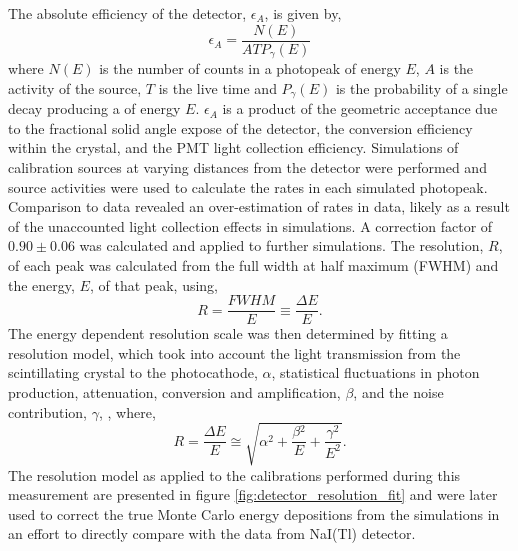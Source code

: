 The absolute efficiency of the detector, $\epsilon_{A}$, is given by,
%
\begin{equation}
    \epsilon_{A} = \frac{N(E)}{ATP_{\gamma}(E)}
    \label{eq:detector_eff}
\end{equation}
%
where $N(E)$ is the number of counts in a photopeak of energy $E$, $A$ is the activity of the source, $T$ is the live time and $P_{\gamma}(E)$ is the probability of a single decay producing a \gray{} of energy $E$. $\epsilon_{A}$ is a product of the geometric acceptance due to the fractional solid angle expose of the detector, the \gray{} conversion efficiency within the crystal, and the PMT light collection efficiency. Simulations of calibration sources at varying distances from the detector were performed and source activities were used to calculate the rates in each simulated photopeak. Comparison to data revealed an over-estimation of rates in data, likely as a result of the unaccounted light collection effects in simulations. A correction factor of $0.90 \pm 0.06$ was calculated and applied to further simulations. The resolution, $R$, of each peak was calculated from the full width at half maximum (FWHM) and the energy, $E$, of that peak, using,
%
\begin{equation}
    R = \frac{FWHM}{E} \equiv \frac{\Delta{}E}{E}.
    \label{eq:detector_eff}
\end{equation}
%
The energy dependent resolution scale was then determined by fitting a resolution model, which took into account the light transmission from the scintillating crystal to the photocathode, $\alpha$, statistical fluctuations in photon production, attenuation, conversion and amplification, $\beta$, and the noise contribution, $\gamma$, \cite{An:2016ses}, where,
%
\begin{equation}
    R = \frac{\Delta{}E}{E} \cong \sqrt{\alpha{}^2 + \frac{\beta{}^2}{E} + \frac{\gamma{}^2}{E^{2}}}.
    \label{eq:resolution_model}
\end{equation}
%
The resolution model as applied to the calibrations performed during this measurement are presented in figure \ref{fig:detector_resolution_fit} and were later used to correct the true Monte Carlo energy depositions from the simulations in an effort to directly compare with the data from NaI(Tl) detector.
%

